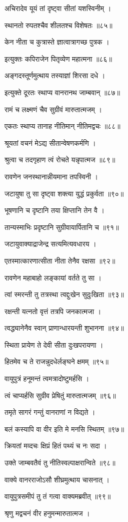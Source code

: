 अचिरादेव यूयं तां दृष्ट्वा सीतां यशस्विनीम् ।

स्थानतो रुपतश्चैव शीलतश्च विशेषतः ॥८५॥

केन नीता च कुत्रास्ते ज्ञात्वात्रागच्छ पुत्रक ।

इत्युक्तः कपिराजेन पितृव्येण महात्मना ॥८६॥

अङ्गदस्तूर्णमुत्थाय तस्याज्ञां शिरसा दधे ।

इत्युक्ते दूरतः स्थाप्य वानरानथ जाम्बवान् ॥८७॥

रामं च लक्ष्मणं चैव सुग्रीवं मारुतात्मजम् ।

एकतः स्थाप्य तानाह नीतिमान् नीतिमद्वचः ॥८८॥

श्रूयतां वचनं मेऽद्य सीतान्वेषणकर्मणि ।

श्रुत्वा च तदगृहाण त्वं रोचते यन्नृपात्मज ॥८९॥

रावणेन जनस्थानान्नीयमाना तपस्विनी ।

जटायुषा तु सा दृष्ट्वा शक्त्या युद्धं प्रकुर्वता ॥९०॥

भूषणानि च दृष्टानि तया क्षिप्तानि तेन वै ।

तान्यस्माभिः प्रदृष्टानि सुग्रीवायार्पितानि च ॥९१॥

जटायुवाक्याद्राजेन्द्र सत्यमित्यवधारय ।

एतस्मात्कारणात्सीता नीता तेनैव रक्षसा ॥९२॥

रावणेन महाबाहो लङ्कायां वर्तते तु सा ।

त्वां स्मरन्ती तु तत्रस्था त्वद्दुःखेन सुदुःखिता ॥९३॥

रक्षन्ती यत्नतो वृत्तं तत्रपि जनकात्मजा ।

त्वद्ध्यानेनैव स्वान् प्राणान्धारयन्ती शुभानना ॥९४॥

स्थिता प्रायेण ते देवी सीता दुःखपरायणा ।

हितमेव च ते राजन्नुदधेर्लङ्घने क्षमम् ॥९५॥

वायुपुत्रं हनूमन्तं त्वमत्रादोष्टुमर्हसि ।

त्वं चाप्यर्हसि सुग्रीव प्रेषितुं मारुतात्मजम् ॥९६॥

तमृते सागरं गन्तुं वानराणां न विद्यते ।

बलं कस्यापि वा वीर इति मे मनसि स्थितम् ॥९७॥

क्रियतां मव्दचः क्षिप्रं हितं पथ्यं च नः सदा ।

उक्ते जाम्बवतैवं तु नीतिस्वल्पाक्षरान्विते ॥९८॥

वाक्ये वानरराजोऽसौ शीघ्रमुत्थाय चासनात् ।

वायुपुत्रसमीपं तु तं गत्वा वाक्यमब्रवीत् ॥९९॥

श्रृणु मद्वचनं वीर हनुमन्मारुतात्मज ।

